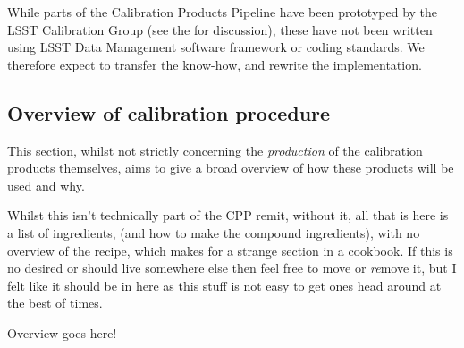 While parts of the Calibration Products Pipeline have been prototyped by the LSST Calibration Group (see the \NewPCP for discussion), these have not been written using LSST Data Management software framework or coding standards. We therefore expect to transfer the know-how, and rewrite the implementation.












\subsection{Overview of calibration procedure}
This section, whilst not strictly concerning the \emph{production} of the calibration products themselves, aims to give a broad overview of how these products will be used and why. 
\begin{note}
Whilst this isn't technically part of the CPP remit, without it, all that is here is a list of ingredients, (and how to make the compound ingredients), with no overview of the recipe, which makes for a strange section in a cookbook. If this is no desired or should live somewhere else then feel free to move or \emph{re}move it, but I felt like it should be in here as this stuff is not easy to get ones head around at the best of times.
\end{note}

Overview goes here! \xxx

